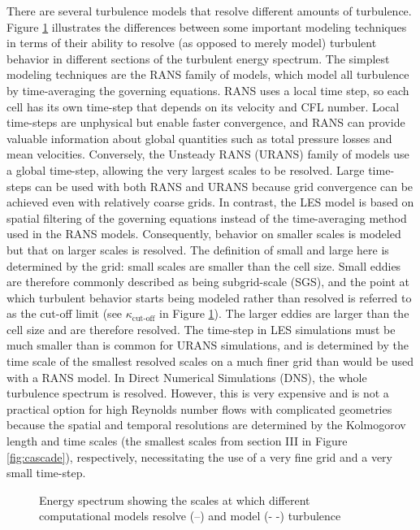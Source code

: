 There are several turbulence models that resolve different amounts of turbulence. Figure \ref{fig:modelling} illustrates the differences between some important modeling techniques in terms of their ability to resolve (as opposed to merely model) turbulent behavior in different sections of the turbulent energy spectrum. The simplest modeling techniques are the RANS family of models, which model all turbulence by time-averaging the governing equations. RANS uses a local time step, so each cell has its own time-step that depends on its velocity and CFL number. Local time-steps are unphysical but enable faster convergence, and RANS can provide valuable information about global quantities such as total pressure losses and mean velocities. Conversely, the Unsteady RANS (URANS) family of models use a global time-step, allowing the very largest scales to be resolved. Large time-steps can be used with both RANS and URANS because grid convergence can be achieved even with relatively coarse grids. In contrast, the LES model is based on spatial filtering of the governing equations instead of the time-averaging method used in the RANS models. Consequently, behavior on smaller scales is modeled but that on larger scales is resolved. The definition of small and large here is determined by the grid: small scales are smaller than the cell size. Small eddies are therefore commonly described as being subgrid-scale (SGS), and the point at which turbulent behavior starts being modeled rather than resolved is referred to as the cut-off limit (see $\kappa _\text{cut-off}$ in Figure \ref{fig:modelling}). The larger eddies are larger than the cell size and are therefore resolved. The time-step in LES simulations must be much smaller than is common for URANS simulations, and is determined by the time scale of the smallest resolved scales on a much finer grid than would be used with a RANS model. In Direct Numerical Simulations (DNS), the whole turbulence spectrum is resolved. However, this is very expensive and is not a practical option for high Reynolds number flows with complicated geometries because the spatial and temporal resolutions are determined by the Kolmogorov length and time scales (the smallest scales from section III in Figure \ref{fig:cascade}), respectively, necessitating the use of a very fine grid and a very small time-step. 

 \begin{figure}[H]
   \centering

   \caption{Energy spectrum showing the scales at which different computational models resolve (--) and model ({\color{gray}- -}) turbulence}
  \label{fig:modelling}
\end{figure}

